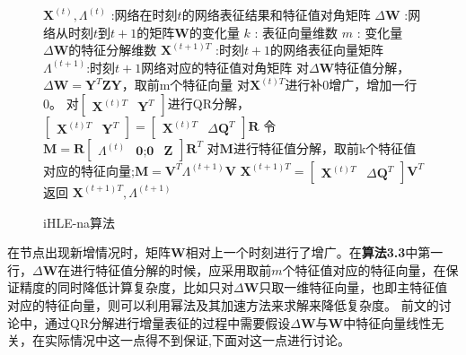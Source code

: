 \begin{figure}[htb]
	\centering
	\begin{minipage}{.7\linewidth}
		\begin{algorithm}[H]\label{iHLE_na}
			\small
			\caption{iHLE-na算法}
			\begin{algorithmic}[1]
				\Require
				\Statex $\textbf{X} ^{(t)},\Lambda^{(t)}$ :网络在时刻$t$的网络表征结果和特征值对角矩阵
				\Statex $\Delta\textbf{W}$ :网络从时刻$t$到$t+1$的矩阵$\textbf{W}$的变化量
				\Statex $k$ : 表征向量维数
				\Statex $m$ : 变化量$\Delta\textbf{W}$的特征分解维数
				\Ensure
				\Statex $\textbf{X}^{(t+1)T}$ :时刻$t+1$的网络表征向量矩阵
				\Statex $\Lambda^{(t+1)}$:时刻$t+1$网络对应的特征值对角矩阵
				\Statex
				\State 对$\Delta\textbf{W}$特征值分解，$\Delta\textbf{W} =  \textbf{Y}^{T} \textbf{Z}  \textbf{Y}$，取前m个特征向量
				\State 对$ \textbf{X}^{(t)T}$进行补0增广，增加一行0。
				\State 对$\begin{bmatrix} \textbf{X}^{(t)T} & \textbf{Y}^{T}\end{bmatrix}$进行QR分解，$\begin{bmatrix} \textbf{X}^{(t)T} & \textbf{Y}^{T}\end{bmatrix} = \begin{bmatrix} \textbf{X}^{(t)T} & \Delta\textbf{Q}^{T} \end{bmatrix} \textbf{R}$
				\State 令$\textbf{M} = \textbf{R}\begin{bmatrix}  \Lambda^{(t)} & \textbf{0};
				\textbf{0} & \textbf{Z} \end{bmatrix}
				\textbf{R}^T$
				\State 对$\textbf{M}$进行特征值分解，取前k个特征值对应的特征向量;$\textbf{M} =\textbf{V}^T \Lambda^{(t+1)} \textbf{V}$
				\State $\textbf{X}^{(t+1)T} = \begin{bmatrix} \textbf{X}^{(t)T} & \Delta\textbf{Q}^{T} \end{bmatrix} \textbf{V}^T$
				\State 返回 $\textbf{X}^{(t+1)T}, \Lambda^{(t+1)}$
			\end{algorithmic}
		\end{algorithm}
	\end{minipage}
\end{figure}
在节点出现新增情况时，矩阵\textbf{W}相对上一个时刻进行了增广。在\textbf{算法3.3}中第一行，$\Delta\textbf{W}$在进行特征值分解的时候，应采用取前$m$个特征值对应的特征向量，在保证精度的同时降低计算复杂度，比如只对$\Delta\textbf{W}$只取一维特征向量，也即主特征值对应的特征向量，则可以利用幂法及其加速方法来求解来降低复杂度。 
前文的讨论中，通过QR分解进行增量表征的过程中需要假设$\Delta\textbf{W}$与$\textbf{W}$中特征向量线性无关，在实际情况中这一点得不到保证,下面对这一点进行讨论。

